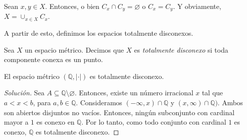 \begin{remark}
	Sean $x, y \in X$. Entonces, o bien $C_x \cap C_y = \varnothing$ o $C_x = C_y$. Y obviamente, $X = \cup_{x \in X} C_x$.
\end{remark}

A partir de esto, definimos los espacios totalmente disconexos.

\begin{definition}
	Sea $X$ un espacio métrico. Decimos que $X$ es \emph{totalmente disconexo} si toda componente conexa es un punto.
\end{definition}

\begin{example}
	El espacio métrico $(\mathbb{Q}, |\cdot|)$ es totalmente disconexo.
\end{example}

\begin{proof}[Solución]
	Sea $A \subseteq \mathbb{Q} \setminus \varnothing$. Entonces, existe un número irracional $x$ tal que $a < x < b$, para $a, b \in \mathbb{Q}$. Consideramos $(-\infty, x) \cap \mathbb{Q}$ y $(x, \infty) \cap \mathbb{Q})$. Ambos son abiertos disjuntos no vacíos. Entonces, ningún subconjunto con cardinal mayor a $1$ es conexo en $\mathbb{Q}$. Por lo tanto, como todo conjunto con cardinal $1$ es conexo, $\mathbb{Q}$ es totalmente disconexo.
\end{proof}










